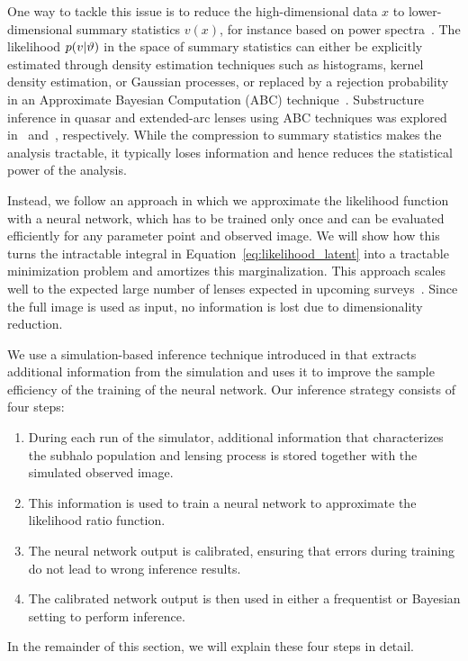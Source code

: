 \documentclass[twocolumn]{aastex63}
\begin{document}
One way to tackle this issue is to reduce the high-dimensional data $x$ to lower-dimensional summary statistics $v(x)$, for instance based on power spectra~\citep{1403.2720,1506.01724,1707.04590,1710.03075,1809.00004,1806.07897,1808.03501}. The likelihood $p(v|\vartheta)$ in the space of summary statistics can either be explicitly estimated through density estimation techniques such as histograms, kernel density estimation, or Gaussian processes, or replaced by a rejection probability in an Approximate Bayesian Computation (ABC) technique~\citep{rubin1984}. Substructure inference in quasar and extended-arc lenses using ABC techniques was explored in~\citet{1712.04945} and~\citet{1702.00009}, respectively. While the compression to summary statistics makes the analysis tractable, it typically loses information and hence reduces the statistical power of the analysis.

Instead, we follow an approach in which we approximate the likelihood function with a neural network, which has to be trained only once and can be evaluated efficiently for any parameter point and observed image. We will show how this turns the intractable integral in Equation~\eqref{eq:likelihood_latent} into a tractable minimization problem and amortizes this marginalization. This approach scales well to the expected large number of lenses expected in upcoming surveys~\citep{1001.2037,1003.5567,2015ApJ...811...20C}. Since the full image is used as input, no information is lost due to dimensionality reduction.

We use a simulation-based inference technique introduced in \citet{1805.00013,1805.00020,1805.12244} that extracts additional information from the simulation and uses it to improve the sample efficiency of the training of the neural network. Our inference strategy consists of four steps:
%
\begin{enumerate}
  \item During each run of the simulator, additional information that characterizes the subhalo population and lensing process is stored together with the simulated observed image.
  \item This information is used to train a neural network to approximate the likelihood ratio function.
  \item The neural network output is calibrated, ensuring that errors during training do not lead to wrong inference results.
  \item The calibrated network output is then used in either a frequentist or Bayesian setting to perform inference.
\end{enumerate}
%
In the remainder of this section, we will explain these four steps in detail.
\end{document}

